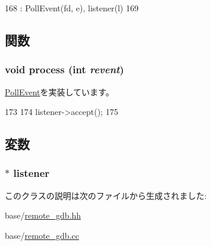 \begin{DoxyCode}
168     : PollEvent(fd, e), listener(l)
169 {}
\end{DoxyCode}


\subsection{関数}
\hypertarget{classGDBListener_1_1Event_aedacbaeee0c89ceca526874c34f6b20b}{
\subsubsection[{process}]{\setlength{\rightskip}{0pt plus 5cm}void process (int {\em revent})}}
\label{classGDBListener_1_1Event_aedacbaeee0c89ceca526874c34f6b20b}


\hyperlink{classPollEvent_a8b870dc0eeb339499d64aa56fc0e2aa5}{PollEvent}を実装しています。


\begin{DoxyCode}
173 {
174     listener->accept();
175 }
\end{DoxyCode}


\subsection{変数}
\hypertarget{classGDBListener_1_1Event_a70415b68fb0739613a991b92c4d127a5}{
\subsubsection[{listener}]{$\ast$ {\bf listener}}}
\label{classGDBListener_1_1Event_a70415b68fb0739613a991b92c4d127a5}


このクラスの説明は次のファイルから生成されました:\begin{DoxyCompactItemize}
\item 
base/\hyperlink{base_2remote__gdb_8hh}{remote\_\-gdb.hh}\item 
base/\hyperlink{base_2remote__gdb_8cc}{remote\_\-gdb.cc}\end{DoxyCompactItemize}
